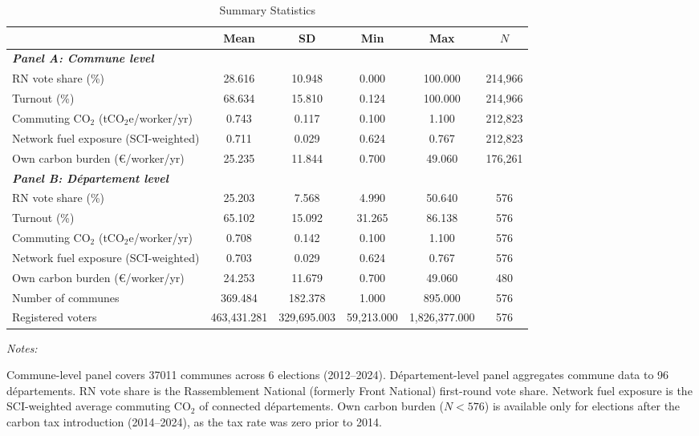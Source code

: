 \begin{table}[!h]
\centering
\caption{Summary Statistics}
\centering
\fontsize{10}{12}\selectfont
\begin{threeparttable}
\begin{tabular}[t]{lccccc}
\toprule
 & Mean & SD & Min & Max & $N$\\
\midrule
\textbf{\textit{Panel A: Commune level}} & \textbf{} & \textbf{} & \textbf{} & \textbf{} & \textbf{}\\
RN vote share (\%) & 28.616 & 10.948 & 0.000 & 100.000 & 214,966\\
Turnout (\%) & 68.634 & 15.810 & 0.124 & 100.000 & 214,966\\
Commuting CO$_2$ (tCO$_2$e/worker/yr) & 0.743 & 0.117 & 0.100 & 1.100 & 212,823\\
Network fuel exposure (SCI-weighted) & 0.711 & 0.029 & 0.624 & 0.767 & 212,823\\
Own carbon burden (\euro/worker/yr) & 25.235 & 11.844 & 0.700 & 49.060 & 176,261\\
\textbf{\textit{Panel B: D\'{e}partement level}} & \textbf{} & \textbf{} & \textbf{} & \textbf{} & \textbf{}\\
RN vote share (\%) & 25.203 & 7.568 & 4.990 & 50.640 & 576\\
Turnout (\%) & 65.102 & 15.092 & 31.265 & 86.138 & 576\\
Commuting CO$_2$ (tCO$_2$e/worker/yr) & 0.708 & 0.142 & 0.100 & 1.100 & 576\\
Network fuel exposure (SCI-weighted) & 0.703 & 0.029 & 0.624 & 0.767 & 576\\
Own carbon burden (\euro/worker/yr) & 24.253 & 11.679 & 0.700 & 49.060 & 480\\
Number of communes & 369.484 & 182.378 & 1.000 & 895.000 & 576\\
Registered voters & 463,431.281 & 329,695.003 & 59,213.000 & 1,826,377.000 & 576\\
\bottomrule
\end{tabular}
\begin{tablenotes}
\item \textit{Notes:} 
\item Commune-level panel covers 37011 communes across 6 elections (2012--2024). D\'{e}partement-level panel aggregates commune data to 96 d\'{e}partements. RN vote share is the Rassemblement National (formerly Front National) first-round vote share. Network fuel exposure is the SCI-weighted average commuting CO$_2$ of connected d\'{e}partements. Own carbon burden ($N < 576$) is available only for elections after the carbon tax introduction (2014--2024), as the tax rate was zero prior to 2014.
\end{tablenotes}
\end{threeparttable}
\end{table}
